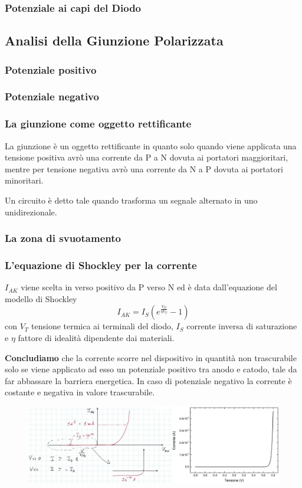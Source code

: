\documentclass[11pt,a4paper,]{article}
\begin{document}
\subsubsection{Potenziale ai capi del Diodo}
\subsection{Analisi della Giunzione Polarizzata}
\subsubsection{Potenziale positivo}
\subsubsection{Potenziale negativo}
\subsubsection{La giunzione come oggetto rettificante}
La giunzione è un oggetto rettificante in quanto solo quando viene applicata una tensione positiva avrò una corrente da P a N dovuta ai portatori maggioritari, mentre per tensione negativa avrò una corrente da N a P dovuta ai portatori minoritari.
\begin{definizione}
    [Rettificatore]
    Un circuito è detto tale quando trasforma un segnale alternato in uno unidirezionale.
\end{definizione}
\subsubsection{La zona di svuotamento}
\subsubsection{L’equazione di Shockley per la corrente}
$I_{AK}$ viene scelta in verso positivo da P verso N ed è data dall'equazione del modello di Shockley
\[
I_{AK} = I_S(e^{\frac{V_D}{\eta V_T}} - 1)
\]
con $V_T$ tensione termica ai terminali del diodo, $I_S$ corrente inversa di saturazione e $\eta$ fattore di idealità dipendente dai materiali.

\textbf{Concludiamo} che la corrente scorre nel dispositivo in quantità non trascurabile solo se viene applicato ad esso un potenziale positivo tra anodo e catodo, tale da far abbassare la barriera energetica.
In caso di potenziale negativo la corrente è costante e negativa in valore trascurabile.
\begin{figure}[H]
    \centering
    \includegraphics[width=0.75\linewidth]{img/corr diodo.png}
\end{figure}
\end{document}
